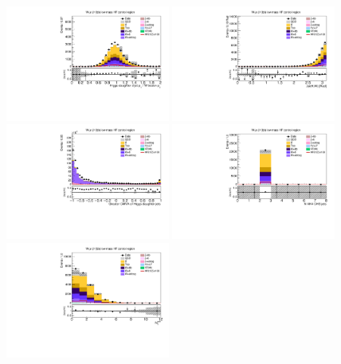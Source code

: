 \begin{figure}[tbp]
  \begin{center}
    \includegraphics[width=0.48\textwidth]{figures/wlnhbb2016/resolved/WmnWHHeavyFlavorCRLowMass_pTBalanceDijetW.pdf}
    \includegraphics[width=0.48\textwidth]{figures/wlnhbb2016/resolved/WmnWHHeavyFlavorCRLowMass_deltaPhiVH.pdf}
    \includegraphics[width=0.48\textwidth]{figures/wlnhbb2016/resolved/WmnWHHeavyFlavorCRLowMass_bDiscrMax.pdf}
    \includegraphics[width=0.48\textwidth]{figures/wlnhbb2016/resolved/WmnWHHeavyFlavorCRLowMass_nJet.pdf}
    \includegraphics[width=0.48\textwidth]{figures/wlnhbb2016/resolved/WmnWHHeavyFlavorCRLowMass_nSoft5.pdf}

\end{center}
\end{figure}
